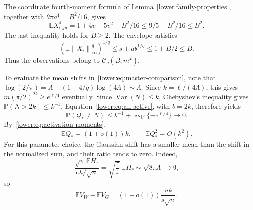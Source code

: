 \documentclass[11pt,letterpaper]{article}
\newenvironment{recovered}{\color{magenta}}{}
\theoremstyle{remark}
\newcommand{\E}{\mathbb E}
\newcommand{\Pp}{\mathbb P}
\newcommand{\Var}{\operatorname{Var}}
\newcommand{\norm}[1]{\left\lVert#1\right\rVert}
\begin{document}
\begin{recovered}
The coordinate fourth-moment formula of
Lemma~\ref{lower:family-properties}, together with
\end{recovered}
\(\theta\pi a^4=B^2/16\), gives
\begin{equation}
 \E X_{i,ju}^4
 =1+4v-5v^2+B^2/16\le9/5+B^2/16\le B^2.
 \label{q4:eq:sparse-coordinate-moments}
\end{equation}
The last inequality holds for \(B\ge2\). The envelope satisfies
\begin{equation}
 (\E\norm{X_i}_\infty^q)^{1/q}
 \le s+a\theta^{1/q}\le1+B/2\le B.
 \label{q4:eq:sparse-envelope-moment}
\end{equation}
Thus the observations belong to \(\mathcal C_q(B,m^2)\).

To evaluate the mean shifts in~\eqref{lower:eq:master-comparison},
note that
\(\log(2/\pi)=\Lambda-(1-4/q)\log(4\Lambda)\sim\Lambda\).
Since \(k=\ell/(4\Lambda)\), this gives
\(m(\pi/2)^{2k}\ge e^{\ell/4}\) eventually.
\begin{recovered}
Since \(\Var(N)\le k\), Chebyshev's inequality gives
\(\Pp(N>2k)\le k^{-1}\). Equation~\eqref{lower:eq:all-active},
with \(b=2k\), therefore yields
\end{recovered}
\[
 \Pp(Q_*\ne N)\le k^{-1}+\exp\{-e^{\ell/4}\}\longrightarrow0.
\]
By~\eqref{lower:eq:activation-moments},
\begin{equation}
 \E Q_*=(1+o(1))k,\qquad \E Q_*^2=O(k^2).
 \label{q4:eq:sparse-max-moments}
\end{equation}
\begin{recovered}
For this parameter choice, the Gaussian shift has a smaller mean
than the shift in the normalized sum, and their ratio tends to zero.
Indeed,
\end{recovered}
\[
 \frac{\sqrt v\,\E H_*}{ak/\sqrt n}
 =\sqrt{\frac\pi k}\,\E H_*
 \sim\sqrt{8\pi\Lambda}\longrightarrow0,
\]
so
\begin{equation}
 \E V_W-\E V_G=(1+o(1))\frac{ak}{s\sqrt n}.
 \label{q4:eq:sparse-mean-gap}
\end{equation}
\end{document}
